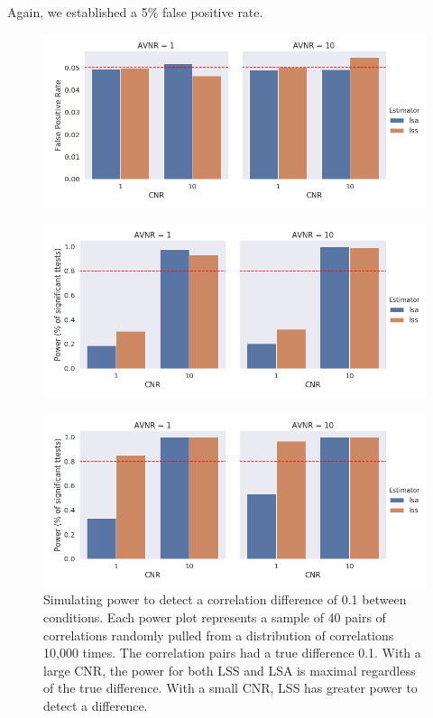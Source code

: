 \documentclass[10pt,letterpaper]{article}
\begin{document}
Again, we established a 5\% false positive rate.

\begin{figure}[H]
  \centering
    \includegraphics[width=\textwidth]{taskswitch-switchXrepeat_fpr}
  \label{fig:task_fpr}
\end{figure}

\begin{figure}[H]
  \centering
  \includegraphics[width=\textwidth]{taskswitch-switchXrepeat_smalldiff}
  \label{fig:task_smalldiff}
\end{figure}

\begin{figure}[H]
  \centering
    \includegraphics[width=\textwidth]{taskswitch-switchXrepeat_largediff}
  \caption{
    Simulating power to detect a correlation difference of 0.1 between
    conditions.
    Each power plot represents a sample of 40 pairs of correlations
    randomly pulled from a distribution of correlations 10,000 times.
    The correlation pairs had a true difference 0.1.
    With a large CNR, the power for both LSS and LSA
    is maximal regardless of the true difference.
    With a small CNR, LSS has greater power to detect a difference.
  }
  \label{fig:task_largediff}
\end{figure}
\end{document}
